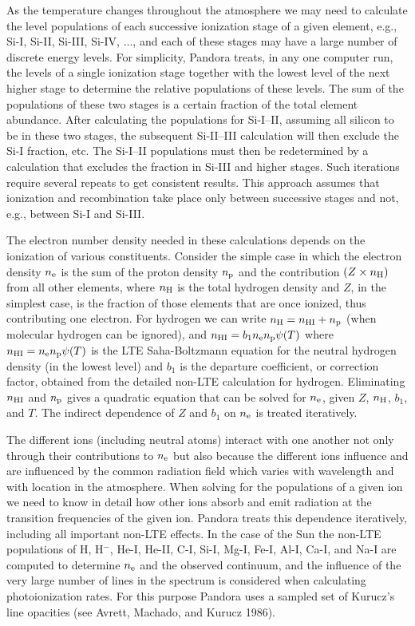\documentclass[11pt,twoside]{article}
\begin{document}
As the temperature changes throughout the atmosphere we may
need to calculate the level populations of each successive
ionization stage of a given element, e.g., Si-I, Si-II, Si-III,
Si-IV, $\ldots$, and each of these stages may have
a large number of discrete energy levels. For simplicity,
Pandora treats, in any one computer run, the levels of a
single ionization stage together with the lowest level of
the next higher stage to determine the relative populations
of these levels. The sum of the populations of these two
stages is a certain fraction of the total element abundance.
After calculating the populations for Si-I--II, assuming all
silicon to be in these two stages, the subsequent Si-II--III
calculation will then exclude the Si-I fraction, etc.
The Si-I--II populations must then be redetermined by a
calculation that excludes the fraction in Si-III and higher stages.
Such iterations require several repeats to get consistent
results. This approach assumes that ionization and recombination
take place only between successive stages and not, e.g., between
Si-I and Si-III.

The electron number density needed in these calculations depends
on the ionization of various constituents. Consider the simple case
in which the electron density $n_{\rm e}$ is the sum of the proton
density $n_{\rm p}$ and the contribution $(Z \times n_{\rm H})$ from all
other elements, where $n_{\rm H}$ is the total hydrogen density and
$Z$, in the simplest case, is the fraction of those elements that
are once ionized, thus contributing one electron. For hydrogen we
can write $n_{\rm H} = n_{\rm HI} + n_{\rm p}$ (when molecular
hydrogen can be ignored), and
$n_{\rm HI} = b_1 n_{\rm e} n_{\rm p} \psi (T)$ where
$n_{\rm HI} = n_{\rm e} n_{\rm p} \psi (T)$ is the LTE Saha-Boltzmann
equation for the neutral hydrogen density (in the lowest level) and
$b_1$ is the departure coefficient, or correction factor, 
obtained from the detailed non-LTE calculation for hydrogen.
Eliminating $n_{\rm HI}$ and $n_{\rm p}$ gives a quadratic equation
that can be solved for $n_{\rm e}$, given $Z$, $n_{\rm H}$, $b_1$,
and $T$. The indirect dependence of $Z$ and $b_1$ on $n_{\rm e}$
is treated iteratively.

The different ions (including neutral atoms) interact
with one another not only through their contributions to $n_{\rm e}$
but also because the different ions influence and are
influenced by the common radiation field which varies with
wavelength and with location in the atmosphere. When solving
for the populations of a given ion we need to know in detail
how other ions absorb and emit radiation at the transition
frequencies of the given ion. Pandora treats this
dependence iteratively, including all important non-LTE
effects. In the case of the Sun the non-LTE populations of
H, H$^-$, He-I, He-II, C-I, Si-I, Mg-I, 
Fe-I, Al-I, Ca-I, and Na-I are
computed to determine $n_{\rm e}$ and the observed continuum, and the
influence of the very large number of lines in the spectrum
is considered when calculating photoionization rates. For
this purpose Pandora uses a sampled set of Kurucz's line
opacities (see Avrett, Machado, and Kurucz 1986).
\end{document}

